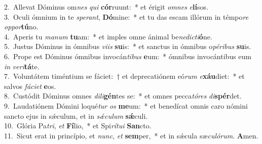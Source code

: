 {2.~}Allevat Dóminus om\textit{nes} \textit{qui} \textbf{cór}ruunt:~* et érigit \textit{om}\textit{nes} \textit{e}\textbf{lí}sos.\\
{3.~}Oculi ómnium in te \textit{spe}\textit{rant}, \textbf{Dó}mine:~* et tu das escam illórum in témpo\textit{re} \textit{op}\textit{por}\textbf{tú}no.\\
{4.~}Aperis tu \textit{ma}\textit{num} \textbf{tu}am:~* et imples omne ánimal be\textit{ne}\textit{di}\textit{cti}\textbf{ó}ne.\\
{5.~}Justus Dóminus in ómnibus \textit{vi}\textit{is} \textbf{su}is:~* et sanctus in ómnibus o\textit{pé}\textit{ri}\textit{bus} \textbf{su}is.\\
{6.~}Prope est Dóminus ómnibus invocán\textit{ti}\textit{bus} \textbf{e}um:~* ómnibus invocántibus eum \textit{in} \textit{ve}\textit{ri}\textbf{tá}te.\\
{7.~}Voluntátem timéntium se fáciet:~† et deprecatiónem eó\textit{rum} \textit{e}\textbf{xáu}diet:~* et salvos \textit{fá}\textit{ci}\textit{et} \textbf{e}os.\\
{8.~}Custódit Dóminus omnes \textit{di}\textit{li}\textbf{gén}tes se:~* et omnes pecca\textit{tó}\textit{res} \textit{di}\textbf{spér}det.\\
{9.~}Laudatiónem Dómini loqué\textit{tur} \textit{os} \textbf{me}um:~* et benedícat omnis caro nómini sancto ejus in sǽculum, et in \textit{sǽ}\textit{cu}\textit{lum} \textbf{sǽ}culi.\\
{10.~}Glória Pa\textit{tri}, \textit{et} \textbf{Fí}lio,~* et Spi\textit{rí}\textit{tu}\textit{i} \textbf{San}cto.\\
{11.~}Sicut erat in princípio, et \textit{nunc}, \textit{et} \textbf{sem}per,~* et in sǽcula sæ\textit{cu}\textit{ló}\textit{rum}. \textbf{A}men.\\
